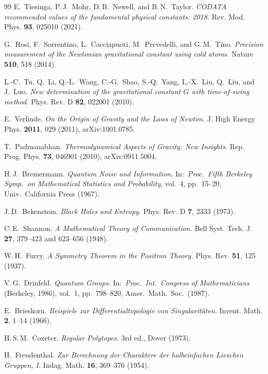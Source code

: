 \documentclass[11pt]{article}
\begin{document}
\begin{thebibliography}{99}
  E.~Tiesinga, P.\,J.~Mohr, D.\,B.~Newell, and B.\,N.~Taylor.
  \emph{CODATA recommended values of the fundamental physical
  constants: 2018.}
  Rev. Mod. Phys. \textbf{93}, 025010 (2021).

  G.~Rosi, F.~Sorrentino, L.~Cacciapuoti, M.~Prevedelli, and
  G.\,M.~Tino.
  \emph{Precision measurement of the Newtonian gravitational
  constant using cold atoms.}
  Nature \textbf{510}, 518 (2014).

  L.-C.~Tu, Q.~Li, Q.-L.~Wang, C.-G.~Shao, S.-Q.~Yang,
  L.-X.~Liu, Q.~Liu, and J.~Luo.
  \emph{New determination of the gravitational constant $G$ with
  time-of-swing method.}
  Phys. Rev. D \textbf{82}, 022001 (2010).

  E.~Verlinde.
  \emph{On the Origin of Gravity and the Laws of Newton.}
  J. High Energy Phys. \textbf{2011}, 029 (2011),
  arXiv:1001.0785.

  T.~Padmanabhan.
  \emph{Thermodynamical Aspects of Gravity: New Insights.}
  Rep. Prog. Phys. \textbf{73}, 046901 (2010), arXiv:0911.5004.

  H.\,J.~Bremermann.
  \emph{Quantum Noise and Information.}
  In:\ \emph{Proc.\ Fifth Berkeley Symp.\ on Mathematical Statistics
  and Probability}, vol.~4, pp.~15--20, Univ.\ California Press
  (1967).

  J.\,D.~Bekenstein.
  \emph{Black Holes and Entropy.}
  Phys. Rev. D \textbf{7}, 2333 (1973).

  C.\,E.~Shannon.
  \emph{A Mathematical Theory of Communication.}
  Bell Syst. Tech. J. \textbf{27}, 379--423 and 623--656 (1948).

  W.\,H.~Furry.
  \emph{A Symmetry Theorem in the Positron Theory.}
  Phys. Rev. \textbf{51}, 125 (1937).

  V.\,G.~Drinfeld.
  \emph{Quantum Groups.}
  In:\ \emph{Proc.\ Int.\ Congress of Mathematicians} (Berkeley,
  1986), vol.~1, pp.~798--820, Amer.\ Math.\ Soc.\ (1987).

  E.~Brieskorn.
  \emph{Beispiele zur Differentialtopologie von Singularit\"aten.}
  Invent. Math. \textbf{2}, 1--14 (1966).

  H.\,S.\,M.~Coxeter.
  \emph{Regular Polytopes.}
  3rd ed., Dover (1973).

  H.~Freudenthal.
  \emph{Zur Berechnung der Charaktere der halbeinfachen Lieschen
  Gruppen, I.}
  Indag. Math. \textbf{16}, 369--376 (1954).


\end{thebibliography}
\end{document}

